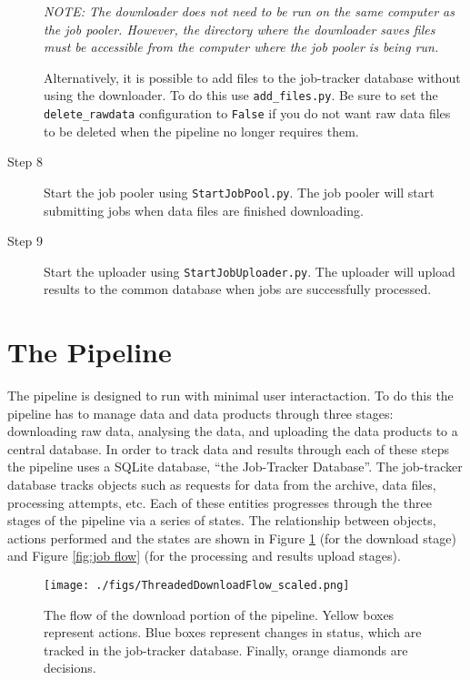 \documentclass[12pt]{article}
\begin{document}
\begin{description}
        \textit{NOTE: The downloader does not need to be run on the same computer as the job pooler. However, the directory where the downloader saves files must be accessible from the computer where the job pooler is being run.}
        
        \smallskip
        
        Alternatively, it is possible to add files to the job-tracker database without using the downloader. To do this use \texttt{add\_files.py}. Be sure to set the \texttt{delete\_rawdata} configuration to \texttt{False} if you do not want raw data files to be deleted when the pipeline no longer requires them. 

    \item[Step 8] Start the job pooler using \texttt{StartJobPool.py}. The job pooler will start submitting jobs when data files are finished downloading. 

    \item[Step 9] Start the uploader using \texttt{StartJobUploader.py}. The uploader will upload results to the common database when jobs are successfully processed.
\end{description}


\section{The Pipeline}
The pipeline is designed to run with minimal user interactaction. To do this the pipeline has to manage data and data products through three stages: downloading raw data, analysing the data, and uploading the data products to a central database. In order to track data and results through each of these steps the pipeline uses a SQLite database, ``the Job-Tracker Database''. The job-tracker database tracks objects such as requests for data from the archive, data files, processing attempts, etc. Each of these entities progresses through the three stages of the pipeline via a series of states. The relationship between objects, actions performed and the states are shown in Figure \ref{fig:download flow} (for the download stage) and Figure \ref{fig:job flow} (for the processing and results upload stages).

\begin{figure}
    \centering
    \texttt{[image: ./figs/ThreadedDownloadFlow\_scaled.png]}
    \caption{The flow of the download portion of the pipeline. Yellow boxes represent actions. Blue boxes represent changes in status, which are tracked in the job-tracker database. Finally, orange diamonds are decisions. \label{fig:download flow}}
\end{figure}
\end{document}
